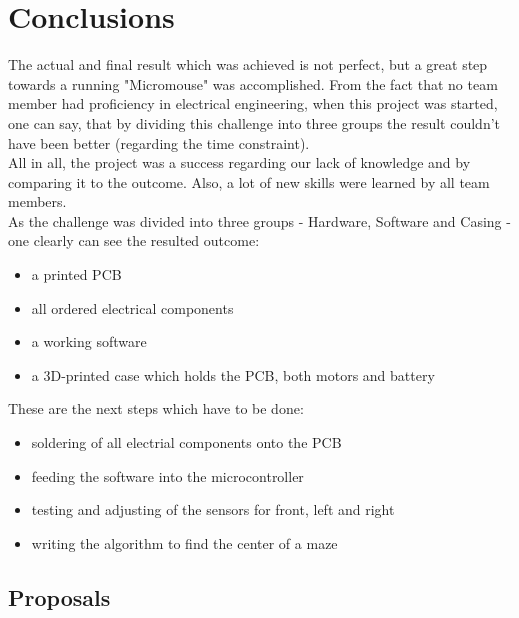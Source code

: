 \section{Conclusions}

The actual and final result which was achieved is not perfect, but a great step towards a running "Micromouse" was accomplished. From the fact that no team member had proficiency in electrical engineering, when this project was started, one can say, that by dividing this challenge into three groups the result couldn't have been better (regarding the time constraint). \\
All in all, the project was a success regarding our lack of knowledge and by comparing it to the outcome. Also, a lot of new skills were learned by all team members.\\

\noindent
As the challenge was divided into three groups - Hardware, Software and Casing - one clearly can see the resulted outcome:
\begin{itemize}
    \item a printed PCB
    \item all ordered electrical components
    \item a working software
    \item a 3D-printed case which holds the PCB, both motors and battery\\
\end{itemize}

\noindent
These are the next steps which have to be done:
\begin{itemize}
    \item soldering of all electrial components onto the PCB
    \item feeding the software into the microcontroller
    \item testing and adjusting of the sensors for front, left and right
    \item writing the algorithm to find the center of a maze
\end{itemize}

\subsection{Proposals}

